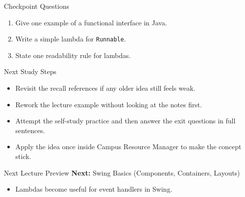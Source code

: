 \documentclass{beamer}
\begin{document}
\begin{frame}{Checkpoint Questions}
  \begin{enumerate}[<+->]
    \item Give one example of a functional interface in Java.
    \item Write a simple lambda for \texttt{Runnable}.
    \item State one readability rule for lambdas.
  \end{enumerate}
  \slidesources{\OOPSUnitIVSources}
\end{frame}

\begin{frame}{Next Study Steps}
\begin{itemize}[<+->]
  \item Revisit the recall references if any older idea still feels weak.
  \item Rework the lecture example without looking at the notes first.
  \item Attempt the self-study practice and then answer the exit questions in full sentences.
  \item Apply the idea once inside Campus Resource Manager to make the concept stick.
\end{itemize}
  \slidesources{\OOPSUnitIVSources}
\end{frame}

\begin{frame}{Next Lecture Preview}
  \textbf{Next:} Swing Basics (Components, Containers, Layouts)
  \vspace{0.6em}
  \begin{itemize}[<+->]
    \item Lambdas become useful for event handlers in Swing.
  \end{itemize}
  \slidesources{\OOPSUnitIVSources}
\end{frame}
\end{document}
